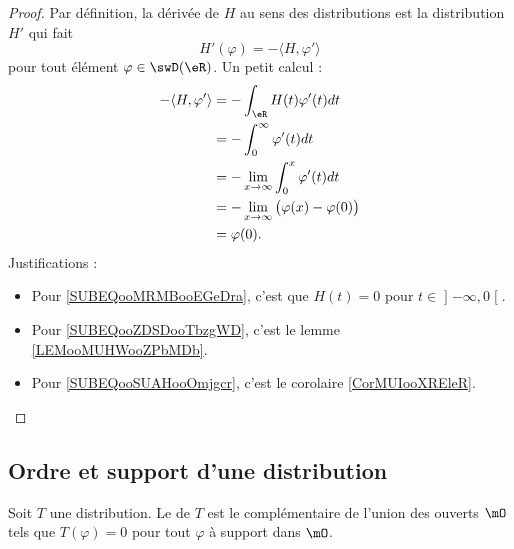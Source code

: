 \begin{proof}
    Par définition, la dérivée de \( H\) au sens des distributions est la distribution \( H'\) qui fait
    \begin{equation}
        H'(\varphi)=-\langle H, \varphi'\rangle 
    \end{equation}
    pour tout élément \( \varphi\in\swD(\eR)\). Un petit calcul :
    \begin{subequations}
        \begin{align}
            -\langle H, \varphi'\rangle &=-\int_{\eR}H(t)\varphi'(t)dt\\
            &=-\int_{0}^{\infty}\varphi'(t)dt       \label{SUBEQooMRMBooEGeDra}\\
            &=-\lim_{x\to \infty} \int_0^x\varphi'(t)dt     \label{SUBEQooZDSDooTbzgWD}\\
            &=-\lim_{x\to \infty} \big( \varphi(x)-\varphi(0) \big)     \label{SUBEQooSUAHooOmjgcr}\\
            &=\varphi(0).
        \end{align}
    \end{subequations}
    Justifications :
    \begin{itemize}
    \item Pour \eqref{SUBEQooMRMBooEGeDra}, c'est que \( H(t)=0\) pour \( t\in \mathopen] -\infty , 0 \mathclose[\).
        \item Pour \eqref{SUBEQooZDSDooTbzgWD}, c'est le lemme \ref{LEMooMUHWooZPbMDb}.
    \item Pour \eqref{SUBEQooSUAHooOmjgcr}, c'est le corolaire \ref{CorMUIooXREleR}.
    \end{itemize}
\end{proof}

\subsection{Ordre et support d'une distribution}

\begin{definition}        \label{DefVILMooBIYerO}
    Soit \( T\) une distribution. Le  de \( T\) est le complémentaire de l'union des ouverts \( \mO\) tels que \( T(\varphi)=0\) pour tout \( \varphi\) à support dans \( \mO\).
\end{definition}

